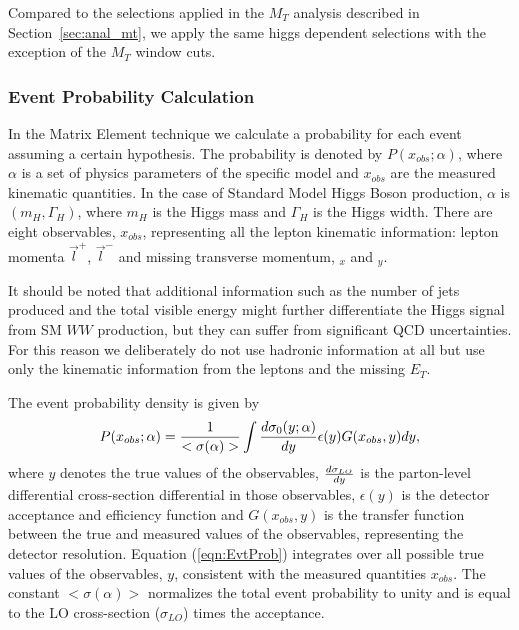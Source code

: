 Compared to the selections applied in the $M_T$ analysis described in Section~\ref{sec:anal_mt}, we 
apply the same higgs dependent selections with the exception of the $M_T$ window cuts. 

\subsubsection{Event Probability Calculation}

In the Matrix Element technique we calculate a probability for each event assuming a
certain hypothesis.  The probability is denoted by $P(x_{obs};\alpha)$,
where $\alpha$ is a set of physics 
parameters of the specific model and $x_{obs}$ are the measured kinematic quantities.
In the case of Standard Model Higgs Boson production,
 $\alpha$ is $(m_H, \Gamma_H)$, where  $m_H$ is the Higgs mass 
and $\Gamma_H$ is the Higgs width. There are eight observables, $x_{obs}$, representing all the 
lepton kinematic information: lepton momenta $\vec{l}^+$, $\vec{l}^-$ and missing 
transverse momentum, \met$_x$ and \met$_y$.

It should be noted that additional information such as the number of jets
produced and the total visible energy might further differentiate the Higgs signal from SM
$WW$ production,
but they can suffer from significant  QCD uncertainties. For this reason we 
deliberately do not use hadronic information at all but use
only the kinematic information from the leptons and the missing $E_T$.

The event probability density is given by
\begin{equation}
P(x_{obs};\alpha) =
 {1 \over < \sigma(\alpha) > }
 \int \frac {d \sigma_{0} (y;\alpha) }{ dy }
 \epsilon (y) G(x_{obs},y) dy,  
\label{eqn:EvtProb}  
\end{equation}
where $y$ denotes the true values of the observables,
$d \sigma_{LO} \over  dy$ is the  parton-level differential cross-section differential
in those observables, $\epsilon(y)$ is the detector acceptance and efficiency function
and $G(x_{obs},y)$ is the transfer function between the true and measured values of the
observables, representing the detector resolution.
Equation (\ref{eqn:EvtProb}) integrates over all possible true values of the
observables, $y$, consistent with the measured quantities $x_{obs}$.
The constant $<\sigma(\alpha)>$ normalizes the total event probability to unity
and is equal to the LO cross-section ($\sigma_{LO}$) times the acceptance.

